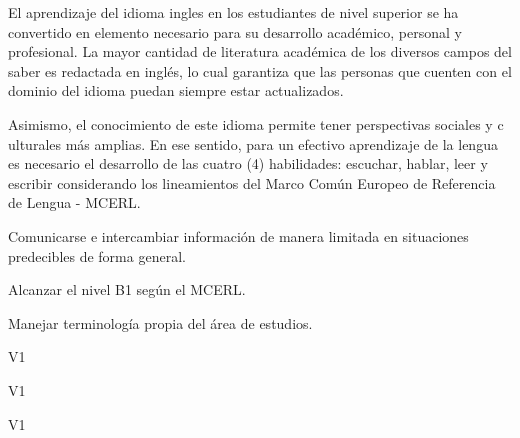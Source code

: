 \begin{syllabus}


\begin{justification}
El aprendizaje del idioma ingles en los estudiantes de nivel superior se ha 
convertido en elemento necesario para su desarrollo académico, personal y 
profesional. La mayor cantidad de literatura académica de los diversos campos 
del saber es redactada en inglés, lo cual garantiza que las personas que cuenten 
con el dominio del idioma puedan siempre estar actualizados. 

Asimismo, el conocimiento de este idioma permite tener perspectivas sociales y c
ulturales más amplias. En ese sentido, para un efectivo aprendizaje de la 
lengua es necesario el desarrollo de las cuatro (4) habilidades: 
escuchar, hablar, leer y escribir considerando los lineamientos del 
Marco Común Europeo de Referencia de Lengua - MCERL.
\end{justification}

\begin{goals}
\item Comunicarse e intercambiar información de manera limitada en situaciones predecibles de forma general.
\item Alcanzar el nivel B1 según el MCERL.
\item Manejar terminología propia del área de estudios.
\end{goals}

\begin{outcomes}{V1}
\item {}
\end{outcomes}

\begin{specificoutcomes}{V1}
\item {}
\item {}
\item {}
\item {}
\end{specificoutcomes}

\begin{competences}{V1}
    \item {}
\end{competences}


\end{syllabus}
